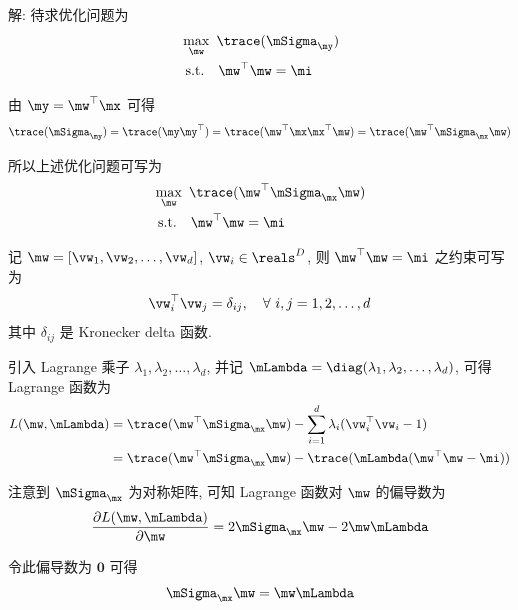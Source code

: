 \documentclass[openany]{ctexbook}
\theoremstyle{kaiti}
\theoremstyle{normal}
\begin{document}
解: 待求优化问题为
\begin{equation}
  \begin{aligned}
    &\max_{\mw}~\trace(\mSigma_{\my})\\
    &~\text{s.t.}\quad\mw^\top\mw=\mi
  \end{aligned}
\end{equation}

由 $\my=\mw^\top\mx$ 可得
\begin{equation}
  \trace(\mSigma_{\my})
  =\trace(\my\my^\top)
  =\trace(\mw^\top\mx\mx^\top\mw)
  =\trace(\mw^\top\mSigma_{\mx}\mw)
\end{equation}

所以上述优化问题可写为
\begin{equation}
  \begin{aligned}
    &\max_{\mw}~\trace(\mw^\top\mSigma_{\mx}\mw)\\
    &~\text{s.t.}\quad\mw^\top\mw=\mi
  \end{aligned}
\end{equation}

记 $\mw=[\vw_1,\vw_2,\dots,\vw_d]$, $\vw_i\in\reals^D$, 则 $\mw^\top\mw=\mi$ 之约束可写为
\begin{equation}
  \vw_i^\top\vw_j=\delta_{ij},\quad\forall~i,j=1,2,\dots,d
\end{equation}
其中 $\delta_{ij}$ 是 Kronecker delta 函数. 

引入 Lagrange 乘子 $\lambda_1,\lambda_2,\dots,\lambda_d$, 并记 $\mLambda=\diag(\lambda_1,\lambda_2,\dots,\lambda_d)$, 可得 Lagrange 函数为
\begin{equation}
  \begin{aligned}
    L(\mw,\mLambda)
    &=\trace(\mw^\top\mSigma_{\mx}\mw)-\sum_{i=1}^d\lambda_i(\vw_i^\top\vw_i-1)\\
    &=\trace(\mw^\top\mSigma_{\mx}\mw)-\trace(\mLambda(\mw^\top\mw-\mi))\\
  \end{aligned}
\end{equation}

注意到 $\mSigma_{\mx}$ 为对称矩阵, 可知 Lagrange 函数对 $\mw$ 的偏导数为
\begin{equation}
  \frac{\partial L(\mw,\mLambda)}{\partial\mw}
  =2\mSigma_{\mx}\mw-2\mw\mLambda
\end{equation}

令此偏导数为 $\bm{0}$ 可得
\begin{equation}
  \mSigma_{\mx}\mw=\mw\mLambda
\end{equation}
\end{document}

